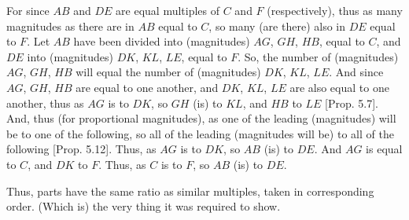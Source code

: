 \begin{Parallel}{}{}
{For since $AB$ and $DE$ are equal multiples of $C$ and $F$ (respectively), thus
as many magnitudes as there are in $AB$ equal to $C$, so many (are there) also
in $DE$ equal to $F$. Let $AB$ have been divided into (magnitudes) $AG$, $GH$, $HB$, equal to $C$, and $DE$ into (magnitudes) $DK$, $KL$,  $LE$, equal to
$F$. So, the number of (magnitudes) $AG$, $GH$,  $HB$ will equal the number
of (magnitudes) $DK$, $KL$, $LE$.
And since $AG$, $GH$, $HB$ are equal to one another, 
and $DK$, $KL$,  $LE$ are also equal to one another,
thus as $AG$ is to
$DK$, so $GH$ (is) to $KL$, and $HB$ to $LE$ [Prop. 5.7]. And, thus (for proportional magnitudes), as one of the leading
(magnitudes) will be to one of the following, so all of the leading (magnitudes will be)
to all of the following [Prop. 5.12].
Thus, as $AG$ is to $DK$, so $AB$ (is) to $DE$. And $AG$ is equal to $C$, and 
$DK$ to $F$. Thus, as $C$ is to $F$, so $AB$ (is) to $DE$.

Thus, parts have the same ratio  as similar multiples,
taken in corresponding order. (Which is) the very thing it was required to
show.}
\end{Parallel}


\vspace{7pt}{\footnotesize \noindent$^\dag$ In modern notation, this proposition
reads that $\alpha:\beta::m\,\alpha:m\,\beta$.}

